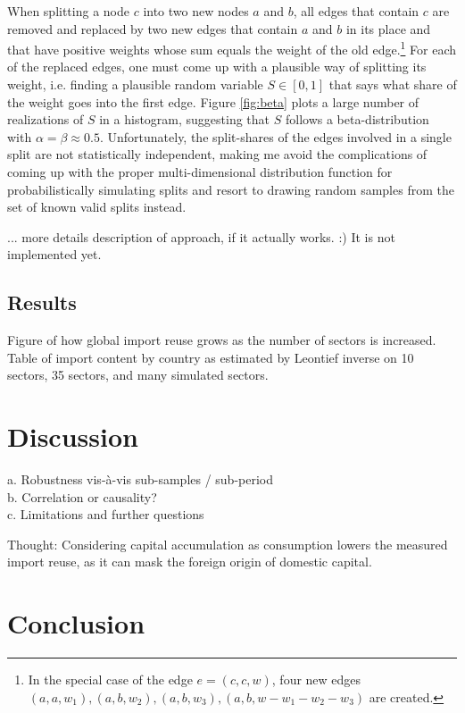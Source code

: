 \documentclass[english]{uzhpub}
\begin{document}
When splitting a node $c$ into two new nodes $a$ and $b$, all edges that contain $c$ are removed and replaced by two new edges that contain $a$ and $b$ in its place and that have positive weights whose sum equals the weight of the old edge.\footnote{In the special case of the edge $e=(c, c, w)$, four new edges $(a, a, w_1), (a, b, w_2), (a, b, w_3), (a, b, w - w_1 - w_2 - w_3)$ are created.} For each of the replaced edges, one must come up with a plausible way of splitting its weight, i.e. finding a plausible random variable $S \in [0,1]$  that says what share of the weight goes into the first edge. Figure \ref{fig:beta} plots a large number of realizations of $S$ in a histogram, suggesting that $S$ follows a beta-distribution with $\alpha=\beta\approx0.5$. Unfortunately, the split-shares of the edges involved in a single split are not statistically independent, making me avoid the complications of coming up with the proper multi-dimensional distribution function for probabilistically simulating splits and resort to drawing random samples from the set of known valid splits instead.

... more details description of approach, if it actually works. :) It is not implemented yet.


\subsection{Results}
Figure of how global import reuse grows as the number of sectors is increased.\\
Table of import content by country as estimated by Leontief inverse on 10 sectors, 35 sectors, and many simulated sectors.\\


\section{Discussion}
a.	Robustness vis-à-vis sub-samples / sub-period\\
b.	Correlation or causality?\\
c.	Limitations and further questions

Thought: Considering capital accumulation as consumption lowers the measured import reuse, as it can mask the foreign origin of domestic capital.

\section{Conclusion}
\end{document}
